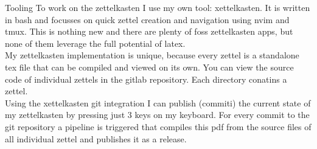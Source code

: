 \documentclass[class=article, crop=false]{standalone}
\begin{document}
\begin{zettel}{Tooling}
    To work on the zettelkasten I use my own tool: xettelkasten. It is written in bash and focusses on quick zettel creation and navigation using nvim and tmux. This is nothing new and there are plenty of foss zettelkasten apps, but none of them leverage the full potential of latex.\\

    My zettelkasten implementation is unique, because every zettel is a standalone tex file that can be compiled and viewed on its own. You can view the source code of individual zettels in the gitlab repository. Each directory conatins a zettel.\\

    Using the xettelkasten git integration I can publish (commiti) the current state of my zettelkasten by pressing just 3 keys on my keyboard. For every commit to the git repository a pipeline is triggered that compiles this pdf from the source files of all individual zettel and publishes it as a release.
\end{zettel}
\end{document}
